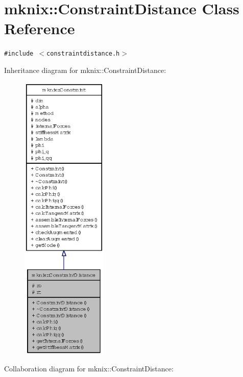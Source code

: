 \hypertarget{classmknix_1_1ConstraintDistance}{
\section{mknix::ConstraintDistance Class Reference}
\label{classmknix_1_1ConstraintDistance}
}
{\tt \#include $<$constraintdistance.h$>$}

Inheritance diagram for mknix::ConstraintDistance:\nopagebreak
\begin{figure}[H]
\begin{center}
\leavevmode
\includegraphics[height=400pt]{classmknix_1_1ConstraintDistance__inherit__graph}
\end{center}
\end{figure}
Collaboration diagram for mknix::ConstraintDistance:\nopagebreak
